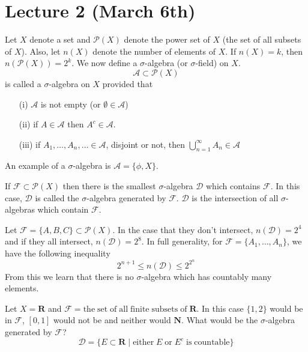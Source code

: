 \section{Lecture 2 (March 6th)}
\begin{defi}
Let $X$ denote a set and $\mathcal{P}(X)$ denote the power set of $X$ (the set of all subsets of $X$). Also, let $n(X)$ denote the number of elements of $X$. If $n(X)=k$, then $n(\mathcal{P}(X))=2^{k}$. We now define a $\sigma $-algebra (or $\sigma $-field) on $X$.
\[\mathcal{A}\subset \mathcal{P}(X)\]
is called a $\sigma $-algebra on $X$ provided that
\begin{itemize}
	\item [(i)] $\mathcal{A}$ is not empty (or $\emptyset \in \mathcal{A}$) 
	\item[(ii)] if $A\in \mathcal{A}$ then $A^{c} \in \mathcal{A}$.
	\item[(iii)] if $A_1,\ldots ,A_{n},\ldots \in \mathcal{A}$, disjoint or not, then $\bigcup^{\infty }_{n=1}A_{n}\in \mathcal{A}$  
\end{itemize}
\end{defi}
\vspace{2ex}
\begin{ex}
	An example of a $\sigma $-algebra is $\mathcal{A}=\{ \phi ,X \}$.
\end{ex}
\vspace{2ex}
\begin{defi}
 If $\mathcal{F}\subset \mathcal{P}(X)$ then there is the smallest $\sigma $-algebra $\mathcal{D}$ which contains $\mathcal{F}$. In this case, $\mathcal{D}$ is called the $\sigma $-algebra generated by $\mathcal{F}$. $\mathcal{D}$ is the intersection of all $\sigma $-algebras which contain $\mathcal{F}$. 
\end{defi}
\vspace{2ex}
\begin{ex}
Let $\mathcal{F}=\{A,B,C\}\subset \mathcal{P}(X)$. In the case that they don't intersect, $n(\mathcal{D})=2^{4}$ and if they all intersect, $n(\mathcal{D})=2^{8}$. In full generality, for $\mathcal{F}=\{A_1,\ldots ,A_{n}\}$, we have the following inequality
\[2^{n+1}\leq n(\mathcal{D})\leq 2^{2^{n}}\]
From this we learn that there is no $\sigma $-algebra which has countably many elements.
\end{ex}
\vspace{2ex}
\begin{ex}
Let $X={\bm R}$ and $\mathcal{F}=\mathrm{the\; set\;of\;all\;finite\;subsets\;of\;}{\bm R}$. In this case $\{1,2\}$ would be in $\mathcal{F}$, $[0,1]$ would not be and neither would ${\bm N}$. What would be the $\sigma $-algebra generated by $\mathcal{F}$?
\[\mathcal{D}=\{E\subset {\bm R} \;|\; \mathrm{either}\;E\;\mathrm{or}\;E^{c}\mathrm{\;is\;countable} \}\]
\end{ex}
